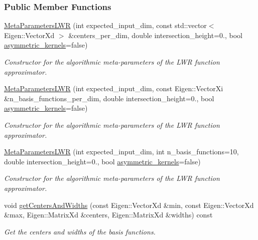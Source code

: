 \subsubsection*{Public Member Functions}
\begin{DoxyCompactItemize}
\item 
\hyperlink{classDmpBbo_1_1MetaParametersLWR_ab75a1ee01157d2cc69a2a2335e344a2e}{Meta\+Parameters\+L\+W\+R} (int expected\+\_\+input\+\_\+dim, const std\+::vector$<$ Eigen\+::\+Vector\+Xd $>$ \&centers\+\_\+per\+\_\+dim, double intersection\+\_\+height=0., bool \hyperlink{classDmpBbo_1_1MetaParametersLWR_ac56e9aa7df627ac838cb4f9d6af5a525}{asymmetric\+\_\+kernels}=false)
\begin{DoxyCompactList}\small\item\em Constructor for the algorithmic meta-\/parameters of the L\+W\+R function approximator. \end{DoxyCompactList}\item 
\hyperlink{classDmpBbo_1_1MetaParametersLWR_ac7dc1faef2a1b02d28b1a89c4aa2f50a}{Meta\+Parameters\+L\+W\+R} (int expected\+\_\+input\+\_\+dim, const Eigen\+::\+Vector\+Xi \&n\+\_\+basis\+\_\+functions\+\_\+per\+\_\+dim, double intersection\+\_\+height=0., bool \hyperlink{classDmpBbo_1_1MetaParametersLWR_ac56e9aa7df627ac838cb4f9d6af5a525}{asymmetric\+\_\+kernels}=false)
\begin{DoxyCompactList}\small\item\em Constructor for the algorithmic meta-\/parameters of the L\+W\+R function approximator. \end{DoxyCompactList}\item 
\hyperlink{classDmpBbo_1_1MetaParametersLWR_ae1c43c06d41d4d4633c3da9ed7b7895f}{Meta\+Parameters\+L\+W\+R} (int expected\+\_\+input\+\_\+dim, int n\+\_\+basis\+\_\+functions=10, double intersection\+\_\+height=0., bool \hyperlink{classDmpBbo_1_1MetaParametersLWR_ac56e9aa7df627ac838cb4f9d6af5a525}{asymmetric\+\_\+kernels}=false)
\begin{DoxyCompactList}\small\item\em Constructor for the algorithmic meta-\/parameters of the L\+W\+R function approximator. \end{DoxyCompactList}\item 
void \hyperlink{classDmpBbo_1_1MetaParametersLWR_ab4dfc7a149e6637cb3e610ad827e3477}{get\+Centers\+And\+Widths} (const Eigen\+::\+Vector\+Xd \&min, const Eigen\+::\+Vector\+Xd \&max, Eigen\+::\+Matrix\+Xd \&centers, Eigen\+::\+Matrix\+Xd \&widths) const 
\begin{DoxyCompactList}\small\item\em Get the centers and widths of the basis functions. \end{DoxyCompactList}\item 

\end{DoxyCompactItemize}
